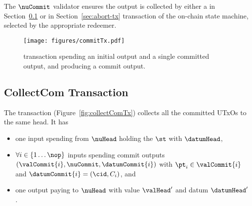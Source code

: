 \noindent The $\nuCommit$ validator ensures the output is collected by either a
\mtxCCom{} in Section~\ref{sec:collect-tx} or \mtxAbort{} in
Section~\ref{sec:abort-tx} transaction of the on-chain state machine, selected
by the appropriate redeemer.

\begin{figure}[h] \centering
	\texttt{[image: figures/commitTx.pdf]}
	\caption{\mtxCom{} transaction spending an initial output and a single
		committed output, and producing a commit output.}\label{fig:commitTx}
\end{figure}

\subsection{CollectCom Transaction}\label{sec:collect-tx}

\noindent The \mtxCCom{} transaction (Figure~\ref{fig:collectComTx}) collects
all the committed UTxOs to the same head. It has
\begin{itemize}
	\item one input spending from $\nuHead$ holding the $\st$ with $\datumHead$,
	\item $\forall i \in \{1 \dots \nop\}$ inputs spending commit outputs
	      $(\valCommit{i}, \nuCommit, \datumCommit{i})$ with $\pt_{i} \in \valCommit{i}$
	      and $\datumCommit{i} = (\cid, C_{i})$, and
	\item one output paying to $\nuHead$ with value $\valHead'$ and
	      datum $\datumHead'$.
\end{itemize}

